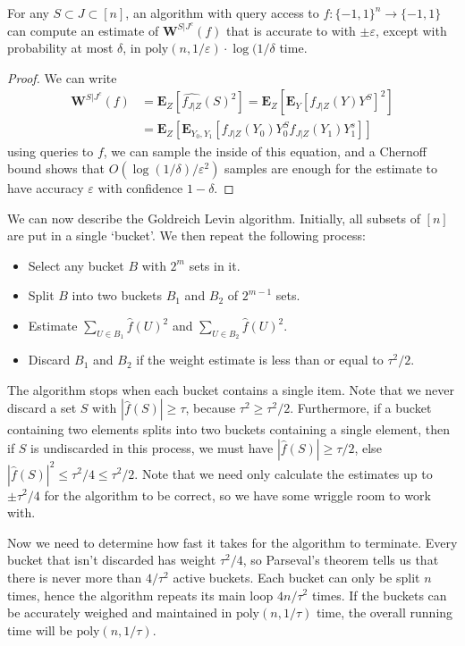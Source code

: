\begin{theorem}
    For any $S \subset J \subset [n]$, an algorithm with query access to $f: \{ -1, 1 \}^n \to \{ -1, 1 \}$ can compute an estimate of $\mathbf{W}^{S|J^c}(f)$ that is accurate to with $\pm \varepsilon$, except with probability at most $\delta$, in $\text{poly}(n,1/\varepsilon) \cdot \log(1/\delta$ time.
\end{theorem}
\begin{proof}
    We can write
    \begin{align*}
        \mathbf{W}^{S|J^c}(f) &= \mathbf{E}_Z[\widehat{f_{J|Z}}(S)^2] = \mathbf{E}_Z \left[ \mathbf{E}_Y \left[ f_{J|Z}(Y) Y^S \right]^2 \right]\\
        &= \mathbf{E}_Z \left[ \mathbf{E}_{Y_0,Y_1} \left[ f_{J|Z}(Y_0) Y_0^S f_{J|Z}(Y_1) Y_1^s \right] \right]
    \end{align*}
    using queries to $f$, we can sample the inside of this equation, and a Chernoff bound shows that $O(\log(1/\delta)/\varepsilon^2)$ samples are enough for the estimate to have accuracy $\varepsilon$ with confidence $1-\delta$.
\end{proof}

We can now describe the Goldreich Levin algorithm. Initially, all subsets of $[n]$ are put in a single `bucket'. We then repeat the following process:
%
\begin{itemize}
    \item Select any bucket $B$ with $2^m$ sets in it.
    \item Split $B$ into two buckets $B_1$ and $B_2$ of $2^{m-1}$ sets.
    \item Estimate $\sum_{U \in B_1} \widehat{f}(U)^2$ and $\sum_{U \in B_2} \widehat{f}(U)^2$.
    \item Discard $B_1$ and $B_2$ if the weight estimate is less than or equal to $\tau^2/2$.
\end{itemize}
%
The algorithm stops when each bucket contains a single item. Note that we never discard a set $S$ with $|\widehat{f}(S)| \geq \tau$, because $\tau^2 \geq \tau^2/2$. Furthermore, if a bucket containing two elements splits into two buckets containing a single element, then if $S$ is undiscarded in this process, we must have $|\widehat{f}(S)| \geq \tau/2$, else $|\widehat{f}(S)|^2 \leq \tau^2/4 \leq \tau^2/2$. Note that we need only calculate the estimates up to $\pm \tau^2/4$ for the algorithm to be correct, so we have some wriggle room to work with.

Now we need to determine how fast it takes for the algorithm to terminate. Every bucket that isn't discarded has weight $\tau^2/4$, so Parseval's theorem tells us that there is never more than $4/\tau^2$ active buckets. Each bucket can only be split $n$ times, hence the algorithm repeats its main loop $4n/\tau^2$ times. If the buckets can be accurately weighed and maintained in $\text{poly}(n,1/\tau)$ time, the overall running time will be $\text{poly}(n,1/\tau)$.


